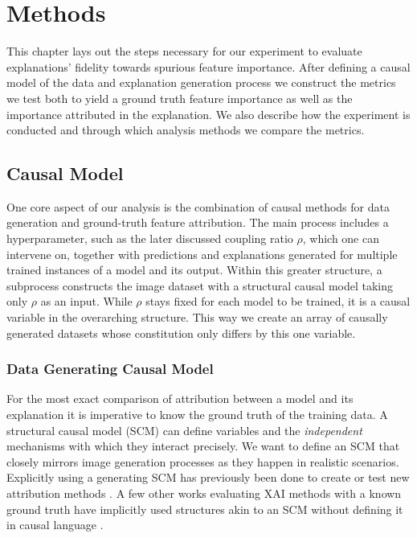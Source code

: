 \chapter{Methods}\label{chapter:method}
This chapter lays out the steps necessary for our experiment to evaluate explanations' fidelity towards spurious feature importance. 
After defining a causal model of the data and explanation generation process we construct the metrics we test both to yield a ground truth feature importance as well as the importance attributed in the explanation. We also describe how the experiment is conducted and through which analysis methods we compare the metrics.

\section{Causal Model}\label{section:causal_model}
One core aspect of our analysis is the combination of causal methods for data generation and ground-truth feature attribution. 
The main process includes a hyperparameter, such as the later discussed coupling ratio $\rho$, which one can intervene on, together with predictions and explanations generated for multiple trained instances of a model and its output. 
Within this greater structure, a subprocess constructs the image dataset with a structural causal model taking only $\rho$ as an input. While $\rho$ stays fixed for each model to be trained, it is a causal variable in the overarching structure. This way we create an array of causally generated datasets whose constitution only differs by this one variable. 

\subsection{Data Generating Causal Model}\label{section:data_gen_causal_model}
For the most exact comparison of attribution between a model and its explanation it is imperative to know the ground truth of the training data. A structural causal model (SCM) can define variables and the \textit{independent} mechanisms with which they interact precisely. We want to define an SCM that closely mirrors image generation processes as they happen in realistic scenarios. 
Explicitly using a generating SCM has previously been done to create or test new attribution methods \citep{Parafita2019, Wilming2023, Clark2023, Goyal2019, Reimers2019, Reimers2020}. A few other works evaluating XAI methods with a known ground truth have implicitly used structures akin to an SCM without defining it in causal language \citep{Kim2018, Yang2019, Arras2022}. 

